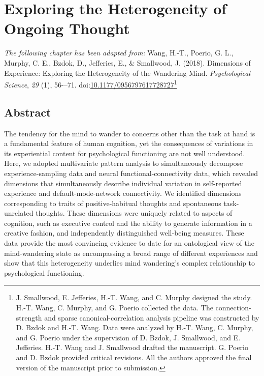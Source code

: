 \chapter{Exploring the Heterogeneity of Ongoing Thought}
\label{ch:study1}
\setcounter{equation}{0}
\textit{The following chapter has been adapted from:} Wang, H.-T., Poerio, G. L., Murphy, C. E., Bzdok, D., Jefferies, E., \& Smallwood, J. (2018). Dimensions of Experience: Exploring the Heterogeneity of the Wandering Mind. \textit{Psychological Science}, \textit{29} (1), 56-–71. doi:\url{10.1177/0956797617728727}\footnote{
J. Smallwood, E. Jefferies, H.-T. Wang, and C. Murphy designed the study. H.-T. Wang, C. Murphy, and G. Poerio collected the data. The connection-strength and sparse canonical-correlation analysis pipeline was constructed by D. Bzdok and H.-T. Wang. Data were analyzed by H.-T. Wang, C. Murphy, and G. Poerio under the supervision of D. Bzdok, J. Smallwood, and E. Jefferies. H.-T. Wang and J. Smallwood drafted the manuscript. G. Poerio and D. Bzdok provided critical revisions. All the authors approved the final version of the manuscript prior to submission.
}
\section{Abstract}
The tendency for the mind to wander to concerns other than the task at hand is a fundamental feature of human cognition, yet the consequences of variations in its experiential content for psychological functioning are not well understood. Here, we adopted multivariate pattern analysis to simultaneously decompose experience-sampling data and neural functional-connectivity data, which revealed dimensions that simultaneously describe individual variation in self-reported experience and default-mode-network connectivity. We identified dimensions corresponding to traits of positive-habitual thoughts and spontaneous task-unrelated thoughts. These dimensions were uniquely related to aspects of cognition, such as executive control and the ability to generate information in a creative fashion, and independently distinguished well-being measures. These data provide the most convincing evidence to date for an ontological view of the mind-wandering state as encompassing a broad range of different experiences and show that this heterogeneity underlies mind wandering's complex relationship to psychological functioning.

